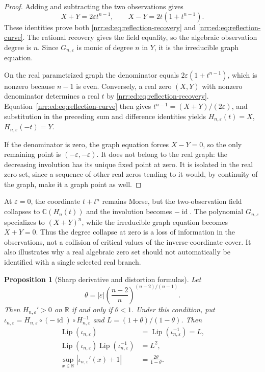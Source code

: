 \documentclass[11pt,letterpaper]{article}
\newtheorem{proposition}[theorem]{Proposition}
\theoremstyle{definition}
\theoremstyle{remark}
\newcommand{\R}{\mathbb R}
\newcommand{\C}{\mathbb C}
\newcommand{\id}{\operatorname{id}}
\newcommand{\Lip}{\operatorname{Lip}}
\newcommand{\eps}{\varepsilon}
\begin{document}
\begin{proof}
Adding and subtracting the two observations gives
\[
 X+Y=2\eps t^{n-1},\qquad X-Y=2t(1+t^{n-1}).
\]
These identities prove both \eqref{nrr:ed:eq:reflection-recovery} and
\eqref{nrr:ed:eq:reflection-curve}. The rational recovery gives the field equality,
so the algebraic observation degree is $n$. Since $G_{n,\eps}$ is monic of
degree $n$ in $Y$, it is the irreducible graph equation.

On the real parametrized graph the denominator equals
$2\eps(1+t^{n-1})$, which is nonzero because $n-1$ is even. Conversely, a real
zero $(X,Y)$ with nonzero denominator determines a real $t$ by
\eqref{nrr:ed:eq:reflection-recovery}. Equation~\eqref{nrr:ed:eq:reflection-curve} then gives
$t^{n-1}=(X+Y)/(2\eps)$, and substitution in the preceding sum and difference
identities yields $H_{n,\eps}(t)=X$, $H_{n,\eps}(-t)=Y$.

If the denominator is zero, the graph equation forces $X-Y=0$, so the only
remaining point is $(-\eps,-\eps)$. It does not belong to the real graph:
the decreasing involution has its unique fixed point at zero. It is isolated
in the real zero set, since a sequence of other real zeros tending to it would,
by continuity of the graph, make it a graph point as well.
\end{proof}

At $\eps=0$, the coordinate $t+t^n$ remains Morse, but the two-observation field
collapses to $\C(H_n(t))$ and the involution becomes $-\id$.
The polynomial $G_{n,\eps}$ specializes to $(X+Y)^n$, while the irreducible graph
equation becomes $X+Y=0$. Thus the degree collapse at zero is a loss of information
in the observations, not a collision of critical values of the inverse-coordinate
cover. It also illustrates why a real algebraic zero set should not automatically
be identified with a single selected real branch.

\begin{proposition}[Sharp derivative and distortion formulas]
\label{nrr:ed:prop:reflection-distortion}
Let
\begin{equation}
 \theta=|\eps|\left(\frac{n-2}{n}\right)^{(n-2)/(n-1)}.
 \label{nrr:ed:eq:theta}
\end{equation}
Then $H_{n,\eps}'>0$ on $\R$ if and only if $\theta<1$. Under this condition,
put $\iota_{n,\eps}=H_{n,\eps}\circ(-\id)\circ H_{n,\eps}^{-1}$ and
$L=(1+\theta)/(1-\theta)$. Then
\begin{align}
 \Lip(\iota_{n,\eps})&=\Lip(\iota_{n,\eps}^{-1})=L,
 \label{nrr:ed:eq:reflection-lip}\\
 \Lip(\iota_{n,\eps})\Lip(\iota_{n,\eps}^{-1})&=L^2,
 \label{nrr:ed:eq:reflection-distortion}\\
 \sup_{x\in\R}|\iota_{n,\eps}'(x)+1|&=\frac{2\theta}{1-\theta}.
 \label{nrr:ed:eq:reflection-derivative}
\end{align}
\end{proposition}
\end{document}
